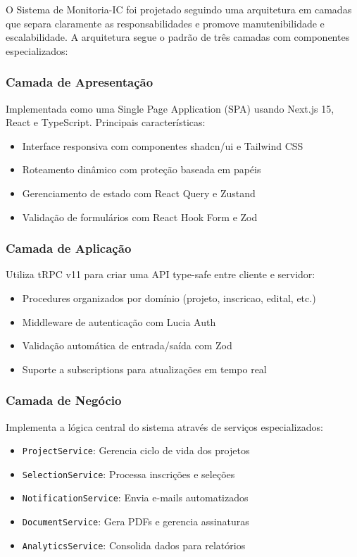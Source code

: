 \documentclass[portuguese]{sbc2025}%
\begin{document}
O Sistema de Monitoria-IC foi projetado seguindo uma arquitetura em camadas que separa claramente as responsabilidades e promove manutenibilidade e escalabilidade. A arquitetura segue o padrão de três camadas com componentes especializados:

\subsubsection{Camada de Apresentação}

Implementada como uma Single Page Application (SPA) usando Next.js 15, React e TypeScript. Principais características:
\begin{itemize}
  \item Interface responsiva com componentes shadcn/ui e Tailwind CSS
  \item Roteamento dinâmico com proteção baseada em papéis
  \item Gerenciamento de estado com React Query e Zustand
  \item Validação de formulários com React Hook Form e Zod
\end{itemize}

\subsubsection{Camada de Aplicação}

Utiliza tRPC v11 para criar uma API type-safe entre cliente e servidor:
\begin{itemize}
  \item Procedures organizados por domínio (projeto, inscricao, edital, etc.)
  \item Middleware de autenticação com Lucia Auth
  \item Validação automática de entrada/saída com Zod
  \item Suporte a subscriptions para atualizações em tempo real
\end{itemize}

\subsubsection{Camada de Negócio}

Implementa a lógica central do sistema através de serviços especializados:
\begin{itemize}
  \item \texttt{ProjectService}: Gerencia ciclo de vida dos projetos
  \item \texttt{SelectionService}: Processa inscrições e seleções
  \item \texttt{NotificationService}: Envia e-mails automatizados
  \item \texttt{DocumentService}: Gera PDFs e gerencia assinaturas
  \item \texttt{AnalyticsService}: Consolida dados para relatórios
\end{itemize}
\end{document}
